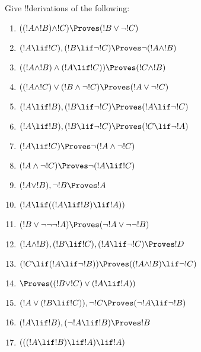 \documentclass[../../../include/open-logic-section]{subfiles}
\begin{document}
\begin{prob}
Give !!{derivation}s of the following:
\begin{enumerate}
  \item $((!A \land !B) \land !C) \Proves (!B \lor \lnot !C)$
  \item $(!A \lif !C), (!B \lif \lnot !C) \Proves \lnot (!A \land !B)$
  \item $((!A \land !B) \land (!A \lif !C)) \Proves (!C \land !B)$
  \item $((!A \land !C) \lor (!B \land \lnot !C) \Proves (!A \lor \lnot !C)$
  \item $(!A \lif !B), (!B \lif \lnot !C) \Proves (!A \lif \lnot !C)$
  
  \item $(!A \lif !B), (!B \lif \lnot !C) \Proves (!C \lif \lnot !A)$
  \item $(!A \lif !C) \Proves \lnot (!A \land  \lnot !C)$
  \item $(!A \land \lnot !C) \Proves \lnot (!A \lif !C)$
  \item $(!A \lor !B), \lnot !B \Proves !A$
  \item $(!A \lif ((!A \lif !B) \lif !A))$
  
  \item $(!B \lor \lnot \lnot \lnot !A) \Proves (\lnot !A \lor \lnot \lnot !B)$
  \item $(!A \land !B), (!B \lif !C), (!A \lif \lnot !C) \Proves !D$
  \item $(!C \lif (!A \lif \lnot !B)) \Proves ((!A \land !B) \lif \lnot !C)$
  \item $\Proves ((!B \lor !C) \lor (!A \lif !A))$
  
  \item $(!A \lor (!B \lif !C)), \lnot !C \Proves (\lnot !A \lif \lnot !B)$
  \item $(!A \lif !B), (\lnot !A \lif !B) \Proves !B$
  \item $(((!A \lif !B) \lif !A) \lif !A)$
 \end{enumerate} 
\end{prob}
\end{document}
